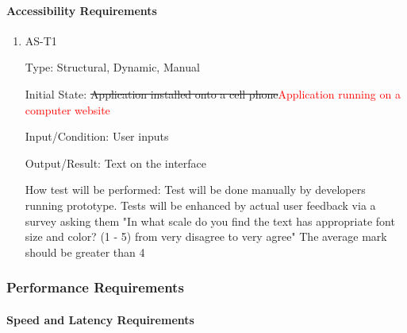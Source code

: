 \documentclass[12pt, titlepage]{article}
\begin{document}
\paragraph{Accessibility Requirements}

\begin{enumerate}

\item{AS-T1\\}

Type: Structural, Dynamic, Manual
					
Initial State: \sout{Application installed onto a cell phone}\textcolor{red}{Application running on a computer website}
					
Input/Condition: User inputs
					
Output/Result: Text on the interface
					
How test will be performed: Test will be done manually by developers running prototype. Tests will be enhanced by actual user feedback via a survey asking them "In what scale do you find the text has appropriate font size and color? (1 - 5) from very disagree to very agree" The average mark should be greater than 4

\end{enumerate}

\subsubsection{Performance Requirements}
		
\paragraph{Speed and Latency Requirements}
\end{document}
